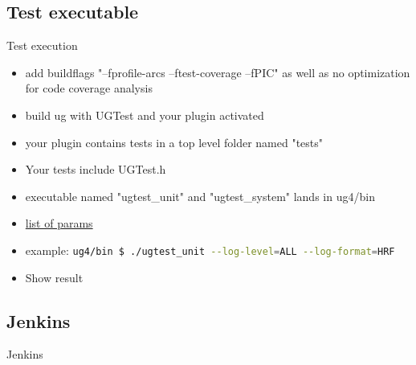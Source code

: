 \documentclass{beamer}
\newcommand{\subsectiontitle}[1]{
    \subsection{#1}
    \begin{frame}
        \LARGE{#1}
    \end{frame}
}
\begin{document}
        \subsection{Test executable}
        \begin{frame}{Test execution}
            \begin{itemize}
                \item add buildflags "--fprofile-arcs --ftest-coverage --fPIC" as well as no optimization for code coverage analysis
                \item build ug with UGTest and your plugin activated
                \item your plugin contains tests in a top level folder named "tests"
                \item Your tests include UGTest.h
                \item executable named "ugtest\_unit" and "ugtest\_system" lands in ug4/bin
                \item \href{https://www.boost.org/doc/libs/1_58_0/libs/test/doc/html/utf/user-guide/runtime-config/reference.html}{list of params}
                \item example: \lstinline[language=bash]{ug4/bin $ ./ugtest_unit --log-level=ALL --log-format=HRF}
                \item Show result
            \end{itemize}
        \end{frame}
        
        \subsectiontitle{Jenkins}
\end{document}
